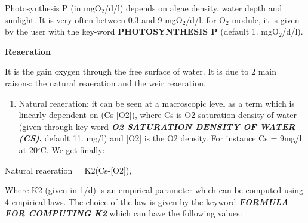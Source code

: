  Photosynthesis P (in mgO${}_{2}$/d/l) depends on algae density, water depth and sunlight. It is very often between 0.3 and 9 mgO${}_{2}$/d/l. for O${}_{2}$ module, it is given by the user with the key-word \textbf{PHOTOSYNTHESIS P} (default 1. mgO${}_{2}$/d/l).


{\bf  Reaeration}

 It is the gain oxygen through the free surface of water. It is due to 2 main raisons:  the natural reaeration and the weir reaeration.

\begin{enumerate}
\item  Natural reaeration: it can be seen at a macroscopic level as a term which is linearly dependent on (Cs-[O2]), where Cs is O2 saturation density of water (given through key-word \textbf{\textit{O2 SATURATION DENSITY OF WATER (CS)},} default 11. mg/l) and [O2] is the O2 density. For instance Cs = 9mg/l at 20${}^\circ$C.  We get finally:
\end{enumerate}

 Natural reaeration = K2(Cs-[O2]),



 Where K2 (given in 1/d) is an empirical parameter which can be computed using 4 empirical laws. The choice of the law is given by the keyword \textbf{\textit{FORMULA FOR COMPUTING K2}} which can have the following values:

